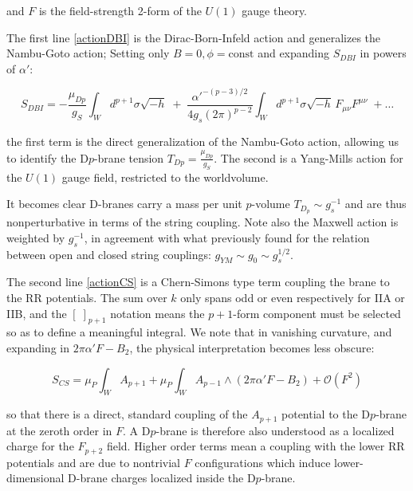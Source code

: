and $F$ is the field-strength 2-form of the $U(1)$ gauge theory.

The first line \eqref{actionDBI} is the Dirac-Born-Infeld action and generalizes the Nambu-Goto action; Setting only $B=0, \phi = \mathrm{const}$ and expanding $S_{DBI}$ in powers of $\alpha'$:

\begin{equation}
	S_{DBI} = -\frac{\mu_{Dp}}{g_S} \int_W d^{p+1} \sigma \sqrt{-h} \; + \; \frac{\alpha'^{-(p-3)/2}}{4 g_s (2\pi)^{p-2} } \int_W d^{p+1} \sigma \sqrt{-h} \, F_{\mu\nu} F^{\mu\nu} \;+  \dots
	\label{DBIexpanded}
\end{equation}

the first term is the direct generalization of the Nambu-Goto action, allowing us to identify the D$p$-brane tension $T_{Dp} = \frac{\mu_{Dp}}{g_S}$. The second is a Yang-Mills action for the $U(1)$ gauge field, restricted to the worldvolume.

It becomes clear D-branes carry a mass per unit $p$-volume $T_{D_p} \sim g_s^{-1}$ and are thus nonperturbative in terms of the string coupling. Note also the Maxwell action is weighted by $g_s^{-1}$, in agreement with what previously found for the relation between open and closed string couplings: $g_{YM} \sim g_0 \sim g_s^{1/2}$.

The second line \eqref{actionCS} is a Chern-Simons type term coupling the brane to the RR potentials. The sum over $k$ only spans odd or even respectively for IIA or IIB, and the $\left[ \; \right]_{p+1}$ notation means the $p+1$-form component must be selected so as to define a meaningful integral. We note that in vanishing curvature, and expanding in $2\pi\alpha'F-B_2$, the physical interpretation becomes less obscure:

\begin{equation}
	S_{CS} = \mu_P \int_W A_{p+1} + \mu_P \int_W A_{p-1} \wedge (2\pi\alpha'F - B_2) + \mathcal{O}(F^2)\label{} \end{equation}

so that there is a direct, standard coupling of the $A_{p+1}$ potential to the D$p$-brane at the zeroth order in $F$. A D$p$-brane is therefore also understood as a localized charge for the $F_{p+2}$ field. Higher order terms mean a coupling with the lower RR potentials and are due to nontrivial $F$ configurations which induce lower-dimensional D-brane charges localized inside the D$p$-brane.


